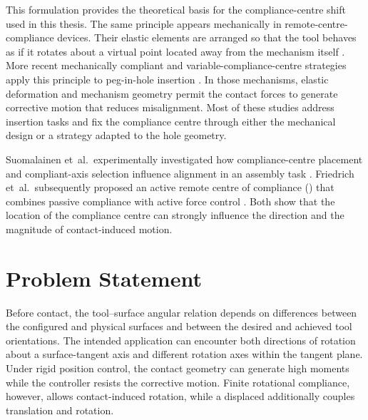 This formulation provides the theoretical
basis for the compliance-centre shift used in this thesis. The same principle
appears mechanically in remote-centre-compliance devices. Their elastic
elements are arranged so that the tool behaves as if it rotates about a virtual
point located away from the mechanism itself
\mbox{\citep{Nevins1989ComputerControlledAssembly,Watson1978RCC}}. More recent
mechanically compliant and variable-compliance-centre strategies apply this
principle to peg-in-hole insertion
\mbox{\citep{Wang2019VariableComplianceCenter,Hartisch2022FlexureRCC}}. In those
mechanisms, elastic deformation and mechanism geometry permit the contact
forces to generate corrective motion that reduces misalignment. Most of these
studies address insertion tasks and fix the compliance centre through either
the mechanical design or a strategy adapted to the hole geometry.

Suomalainen \mbox{et al.\ }experimentally investigated how
compliance-centre placement and compliant-axis selection influence alignment
in an assembly task \mbox{\citep{Suomalainen2019DualArmCompliance}}. Friedrich
\mbox{et al.\ }subsequently proposed an active remote centre of compliance
() that combines passive compliance with active force control
\mbox{\citep{Friedrich2025ActiveRCC}}. Both show that the location of the
compliance centre can strongly influence the direction and the magnitude of
contact-induced motion.


\section{Problem Statement}

Before contact, the tool--surface angular relation depends on differences
between the configured and physical surfaces and between the desired and
achieved tool orientations. The intended application can encounter both
directions of rotation about a surface-tangent axis and different rotation
axes within the tangent plane. Under rigid position control, the contact
geometry can generate high moments while the controller resists the corrective
motion. Finite rotational compliance, however, allows contact-induced
rotation, while a displaced  additionally couples translation and
rotation.

